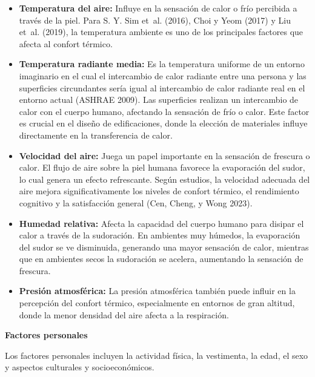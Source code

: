 \documentclass[
  12pt,
  letterpaper,
  DIV=11,
  numbers=noendperiod]{scrreport}
\begin{document}
\begin{itemize}
\item
  \textbf{Temperatura del aire:} Influye en la sensación de calor o frío
  percibida a través de la piel. Para S. Y. Sim et~al. (2016), Choi y
  Yeom (2017) y Liu et~al. (2019), la temperatura ambiente es uno de los
  principales factores que afecta al confort térmico.
\item
  \textbf{Temperatura radiante media:} Es la temperatura uniforme de un
  entorno imaginario en el cual el intercambio de calor radiante entre
  una persona y las superficies circundantes sería igual al intercambio
  de calor radiante real en el entorno actual (ASHRAE 2009). Las
  superficies realizan un intercambio de calor con el cuerpo humano,
  afectando la sensación de frío o calor. Este factor es crucial en el
  diseño de edificaciones, donde la elección de materiales influye
  directamente en la transferencia de calor.
\item
  \textbf{Velocidad del aire:} Juega un papel importante en la sensación
  de frescura o calor. El flujo de aire sobre la piel humana favorece la
  evaporación del sudor, lo cual genera un efecto refrescante. Según
  estudios, la velocidad adecuada del aire mejora significativamente los
  niveles de confort térmico, el rendimiento cognitivo y la satisfacción
  general (Cen, Cheng, y Wong 2023).
\item
  \textbf{Humedad relativa:} Afecta la capacidad del cuerpo humano para
  disipar el calor a través de la sudoración. En ambientes muy húmedos,
  la evaporación del sudor se ve disminuida, generando una mayor
  sensación de calor, mientras que en ambientes secos la sudoración se
  acelera, aumentando la sensación de frescura.
\item
  \textbf{Presión atmosférica:} La presión atmosférica también puede
  influir en la percepción del confort térmico, especialmente en
  entornos de gran altitud, donde la menor densidad del aire afecta a la
  respiración.
\end{itemize}

\textbf{Factores personales}

Los factores personales incluyen la actividad física, la vestimenta, la
edad, el sexo y aspectos culturales y socioeconómicos.
\end{document}
